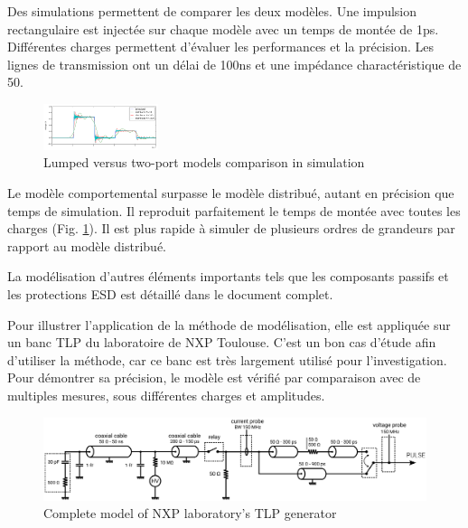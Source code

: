 Des simulations permettent de comparer les deux modèles.
Une impulsion rectangulaire est injectée sur chaque modèle avec un temps de montée de 1ps.
Différentes charges permettent d'évaluer les performances et la précision.
Les lignes de transmission ont un délai de 100ns et une impédance charactéristique de 50\textOmega{}.

\begin{figure}[!h]
  \centering
  \includegraphics[width=0.3\textwidth]{src/1/figures/tline_comparison.png}
  \caption{Lumped versus two-port models comparison in simulation}
  \label{fig:lines-simulations}
\end{figure}

Le modèle comportemental surpasse le modèle distribué, autant en précision que temps de simulation.
Il reproduit parfaitement le temps de montée avec toutes les charges (Fig. \ref{fig:lines-simulations}).
Il est plus rapide à simuler de plusieurs ordres de grandeurs par rapport au modèle distribué.

La modélisation d'autres éléments importants tels que les composants passifs et les protections ESD est détaillé dans le document complet.

Pour illustrer l'application de la méthode de modélisation, elle est appliquée sur un banc TLP du laboratoire de NXP Toulouse.
C'est un bon cas d'étude afin d'utiliser la méthode, car ce banc est très largement utilisé pour l'investigation.
Pour démontrer sa précision, le modèle est vérifié par comparaison avec de multiples mesures, sous différentes charges et amplitudes.

\begin{figure}[!h]
  \centering
  \includegraphics[width=\textwidth]{src/1/figures/complete_nxp_tlp_model.pdf}
  \caption{Complete model of NXP laboratory's TLP generator}
  \label{fig:complete-tlp-model}
\end{figure}

